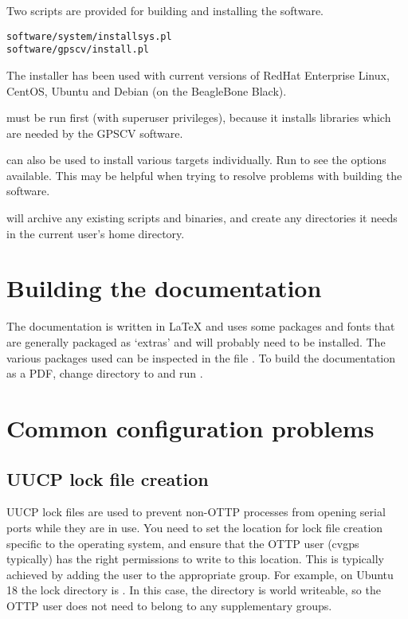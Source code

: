 Two scripts are provided for building and installing the software.
\begin{lstlisting}
software/system/installsys.pl
software/gpscv/install.pl
\end{lstlisting}

The installer has been used with current versions of RedHat Enterprise Linux, 
CentOS, Ubuntu and Debian (on the BeagleBone Black).

 must be run first (with superuser privileges), 
because it installs libraries which are needed by the GPSCV software.

 can also be used to install various targets individually.
Run  to see the options available. 
This may be helpful when trying to resolve problems with building the software.

 will archive any existing scripts and binaries, and create any
directories it needs in the current user's home directory.

\section{Building the documentation}

The documentation is written in LaTeX and uses some packages and fonts that are generally packaged as `extras'
and will probably need to be installed. The various packages used can be inspected in the file
.
To build the documentation as a PDF, change directory to  and run .

\section{Common configuration problems}

\subsection{UUCP lock file creation}

UUCP lock files are used to prevent non-OTTP processes from opening serial ports while they are 
in use. You need to set the location for lock file creation specific to the operating system, 
and ensure that the OTTP user (cvgps typically) has the right permissions to write to this location. 
This is typically achieved by adding the user to the appropriate group. 
For example, on Ubuntu 18 the lock directory is . 
In this case, the directory is world writeable, so 
the OTTP user does not need to belong to any supplementary groups.

